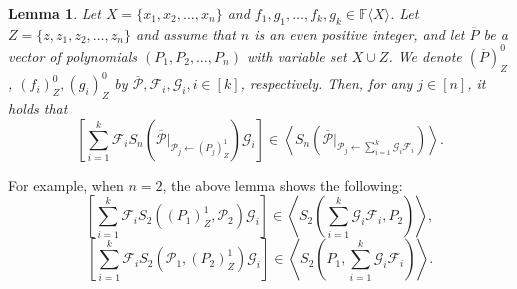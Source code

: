 \documentclass[12pt,reqno]{article}
\newtheorem{lemma}[theorem]{Lemma}
\newcommand\F{\ensuremath{\mathbb F}}
\renewcommand{\t}[1]{\overline{#1}}
\newcommand{\anbra}[1]{\ensuremath{\left[ #1\right]}}
\newcommand{\zd}[2]{(#1)_Z^{#2}}
\newcommand{\ideal}[1]{\ensuremath{\left\langle #1\right\rangle}}
\begin{document}
\begin{lemma}\label{lem:transfer-polynomials}
Let $X=\{x_1,x_2,\ldots,x_n\}$ and $f_1,g_1 ,\ldots,  f_k,g_k \in  \F \langle X \rangle $. Let $Z=\{z,z_1,z_2,\ldots,z_n\}$ and assume that  $n$ is an even positive integer, and let
$\t P $ be a vector of polynomials $(P_1,P_2,\ldots,P_n)$ with variable set $X\cup Z$. We denote $\zd{\t P}{0}$, $\zd{f_i}{0},
\zd{g_i}{0}$ by $\overline {\mathcal{P}},\mathcal F_i,\mathcal G_i,i\in[k]$, respectively. Then, for any $j\in [n]$, it holds that
$$\anbra{\sum_{i=1}^k\mathcal F_i S_{n}(\t {\mathcal P}|_{{\mathcal P}_j\leftarrow \zd{P_j}{1}})\mathcal G_i } \in  \ideal{ S_{n}(\t{\mathcal P}|_{{\mathcal P }_j\leftarrow \sum_{i=1}^k\mathcal G_i\mathcal F_i})}. $$
\end{lemma}
For example, when $n=2$, the above lemma shows the following:
$$\anbra{\sum_{i=1}^k\mathcal F_iS_2(\zd{P_1}{1},\mathcal P_2)\mathcal G_i}\in \ideal{S_2(\sum_{i=1}^k\mathcal G_i\mathcal F_i,P_2  )},$$
$$\anbra{\sum_{i=1}^k\mathcal F_i S_2(\mathcal P_1,\zd{P_2}{1})\mathcal G_i}\in \ideal{S_2(P_1, \sum_{i=1}^k\mathcal G_i\mathcal F_i )}.$$
\end{document}
